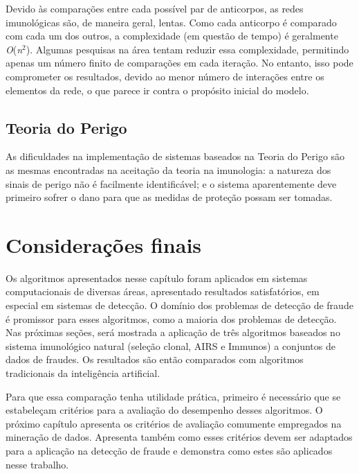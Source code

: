 Devido às comparações entre cada possível par de anticorpos, as redes imunológicas são, de maneira geral, lentas. Como cada anticorpo é comparado com cada um dos outros, a complexidade (em questão de tempo) é geralmente \emph{O}(\emph{n$^{2}$}). Algumas pesquisas na área tentam reduzir essa complexidade, permitindo apenas um número finito de comparações em cada iteração. No entanto, isso pode comprometer os resultados, devido ao menor número de interações entre os elementos da rede, o que parece ir contra o propósito inicial do modelo.

\subsection{Teoria do Perigo}

As dificuldades na implementação de sistemas baseados na Teoria do Perigo são as mesmas encontradas na aceitação da teoria na imunologia: a natureza dos sinais de perigo não é facilmente identificável; e o sistema aparentemente deve primeiro sofrer o dano para que as medidas de proteção possam ser tomadas.

\section{Considerações finais}

Os algoritmos apresentados nesse capítulo foram aplicados em sistemas computacionais de diversas áreas, apresentado resultados satisfatórios, em especial em sistemas de detecção. O domínio dos problemas de detecção de fraude é promissor para esses algoritmos, como a maioria dos problemas de detecção. Nas próximas seções, será mostrada a aplicação de três algoritmos baseados no sistema imunológico natural (seleção clonal, AIRS e Immunos) a conjuntos de dados de fraudes. Os resultados são então comparados com algoritmos tradicionais da inteligência artificial.

Para que essa comparação tenha utilidade prática, primeiro é necessário que se estabeleçam critérios para a avaliação do desempenho desses algoritmos. O próximo capítulo apresenta os critérios de avaliação comumente empregados na mineração de dados. Apresenta também como esses critérios devem ser adaptados para a aplicação na detecção de fraude e demonstra como estes são aplicados nesse trabalho.
